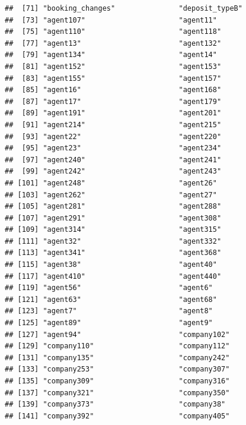 \documentclass[
]{article}
\begin{document}
\begin{verbatim}
##  [71] "booking_changes"               "deposit_typeB"                
##  [73] "agent107"                      "agent11"                      
##  [75] "agent110"                      "agent118"                     
##  [77] "agent13"                       "agent132"                     
##  [79] "agent134"                      "agent14"                      
##  [81] "agent152"                      "agent153"                     
##  [83] "agent155"                      "agent157"                     
##  [85] "agent16"                       "agent168"                     
##  [87] "agent17"                       "agent179"                     
##  [89] "agent191"                      "agent201"                     
##  [91] "agent214"                      "agent215"                     
##  [93] "agent22"                       "agent220"                     
##  [95] "agent23"                       "agent234"                     
##  [97] "agent240"                      "agent241"                     
##  [99] "agent242"                      "agent243"                     
## [101] "agent248"                      "agent26"                      
## [103] "agent262"                      "agent27"                      
## [105] "agent281"                      "agent288"                     
## [107] "agent291"                      "agent308"                     
## [109] "agent314"                      "agent315"                     
## [111] "agent32"                       "agent332"                     
## [113] "agent341"                      "agent368"                     
## [115] "agent38"                       "agent40"                      
## [117] "agent410"                      "agent440"                     
## [119] "agent56"                       "agent6"                       
## [121] "agent63"                       "agent68"                      
## [123] "agent7"                        "agent8"                       
## [125] "agent89"                       "agent9"                       
## [127] "agent94"                       "company102"                   
## [129] "company110"                    "company112"                   
## [131] "company135"                    "company242"                   
## [133] "company253"                    "company307"                   
## [135] "company309"                    "company316"                   
## [137] "company321"                    "company350"                   
## [139] "company373"                    "company38"                    
## [141] "company392"                    "company405"                   

\end{verbatim}
\end{document}
